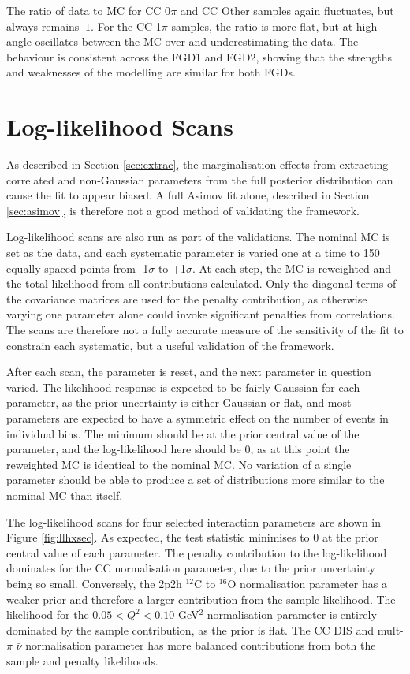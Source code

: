 The ratio of data to MC for CC 0$\pi$ and CC Other samples again fluctuates, but always remains $\>1$. For the CC 1$\pi$ samples, the ratio is more flat, but at high angle oscillates between the MC over and underestimating the data. The behaviour is consistent across the FGD1 and FGD2, showing that the strengths and weaknesses of the modelling are similar for both FGDs.

\FloatBarrier
\section{Log-likelihood Scans}\label{sec:llhscan}

As described in Section \ref{sec:extrac}, the marginalisation effects from extracting correlated and non-Gaussian parameters from the full posterior distribution can cause the fit to appear biased. A full Asimov fit alone, described in Section \ref{sec:asimov}, is therefore not a good method of validating the framework.

Log-likelihood scans are also run as part of the validations. The nominal MC is set as the data, and each systematic parameter is varied one at a time to 150 equally spaced points from -1$\sigma$ to +1$\sigma$. At each step, the MC is reweighted and the total likelihood from all contributions calculated. Only the diagonal terms of the covariance matrices are used for the penalty contribution, as otherwise varying one parameter alone could invoke significant penalties from correlations. The scans are therefore not a fully accurate measure of the sensitivity of the fit to constrain each systematic, but a useful validation of the framework.

After each scan, the parameter is reset, and the next parameter in question varied. The likelihood response is expected to be fairly Gaussian for each parameter, as the prior uncertainty is either Gaussian or flat, and most parameters are expected to have a symmetric effect on the number of events in individual bins. The minimum should be at the prior central value of the parameter, and the log-likelihood here should be 0, as at this point the reweighted MC is identical to the nominal MC. No variation of a single parameter should be able to produce a set of distributions more similar to the nominal MC than itself.

The log-likelihood scans for four selected interaction parameters are shown in Figure \ref{fig:llhxsec}. As expected, the test statistic minimises to 0 at the prior central value of each parameter. The penalty contribution to the log-likelihood dominates for the CC normalisation parameter, due to the prior uncertainty being so small. Conversely, the 2p2h $^{12}$C to $^{16}$O normalisation parameter has a weaker prior and therefore a larger contribution from the sample likelihood. The likelihood for the $0.05 < Q^2 < 0.10$ GeV$^2$ normalisation parameter is entirely dominated by the sample contribution, as the prior is flat. The CC DIS and mult-$\pi$ $\bar{\nu}$ normalisation parameter has more balanced contributions from both the sample and penalty likelihoods.

